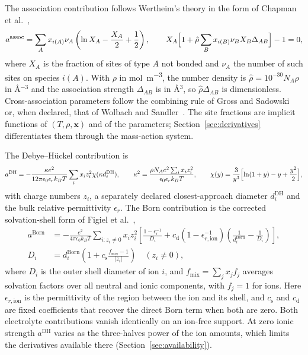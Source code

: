 The association contribution follows Wertheim's theory in the form of Chapman et al.~\citep{Chapman1990},
\begin{equation}
a^{\mathrm{assoc}}=\sum_A x_{i(A)}\nu_A\left(\ln X_A-\frac{X_A}{2}+\frac12\right),\qquad
X_A\Bigl[1+\hat\rho\sum_B x_{i(B)}\nu_B X_B\Delta_{AB}\Bigr]-1=0,
\label{eq:mass-action}
\end{equation}
where $X_A$ is the fraction of sites of type $A$ not bonded and $\nu_A$ the number of such sites on species $i(A)$.
With $\rho$ in \si{\mol\per\cubic\metre}, the number density is $\hat\rho=10^{-30}N_A\rho$ in \AA$^{-3}$ and the association strength $\Delta_{AB}$ is in \AA$^3$, so $\hat\rho\Delta_{AB}$ is dimensionless.
Cross-association parameters follow the combining rule of Gross and Sadowski~\citep{Gross2002} or, when declared, that of Wolbach and Sandler~\citep{wolbachUsingMolecularOrbital1998}.
The site fractions are implicit functions of $(T,\rho,\mathbf{x})$ and of the parameters; Section~\ref{sec:derivatives} differentiates them through the mass-action system.

The Debye--H\"uckel contribution is~\citep{Held2008,Bulow2019}
\begin{equation}
a^{\mathrm{DH}}=-\frac{\kappa e^2}{12\pi\epsilon_0\epsilon_r k_BT}\sum_{i}x_iz_i^2\chi(\kappa d_i^{\mathrm{DH}}),\qquad
\kappa^2=\frac{\rho N_A e^2\sum_i x_iz_i^2}{\epsilon_0\epsilon_r k_BT},\qquad
\chi(y)=\frac{3}{y^3}\Bigl[\ln(1+y)-y+\frac{y^2}{2}\Bigr],
\label{eq:dh}
\end{equation}
with charge numbers $z_i$, a separately declared closest-approach diameter $d_i^{\mathrm{DH}}$ and the bulk relative permittivity $\epsilon_r$.
The Born contribution is the corrected solvation-shell form of Figiel et al.~\citep{Figiel2025,Figiel2026Correction},
\begin{equation}
\begin{aligned}
a^{\mathrm{Born}}&=-\frac{e^2}{4\pi\epsilon_0k_BT}\sum_{i:z_i\ne0}x_iz_i^2\left[\frac{1-\epsilon_r^{-1}}{D_i}+c_{\mathrm{d}}\left(1-\epsilon_{r,\mathrm{ion}}^{-1}\right)\left(\frac{1}{d_i^{\mathrm{Born}}}-\frac{1}{D_i}\right)\right],\\
D_i&=d_i^{\mathrm{Born}}\left(1+c_{\mathrm{s}}\frac{f_{\mathrm{mix}}-1}{\lvert z_i\rvert}\right)\quad(z_i\ne0),
\end{aligned}
\label{eq:born}
\end{equation}
where $D_i$ is the outer shell diameter of ion $i$, and $f_{\mathrm{mix}}=\sum_jx_jf_j$ averages solvation factors over all neutral and ionic components, with $f_j=1$ for ions.
Here $\epsilon_{r,\mathrm{ion}}$ is the permittivity of the region between the ion and its shell, and $c_{\mathrm{s}}$ and $c_{\mathrm{d}}$ are fixed coefficients that recover the direct Born term when both are zero.
Both electrolyte contributions vanish identically on an ion-free support.
At zero ionic strength $a^{\mathrm{DH}}$ varies as the three-halves power of the ion amounts, which limits the derivatives available there (Section~\ref{sec:availability}).

